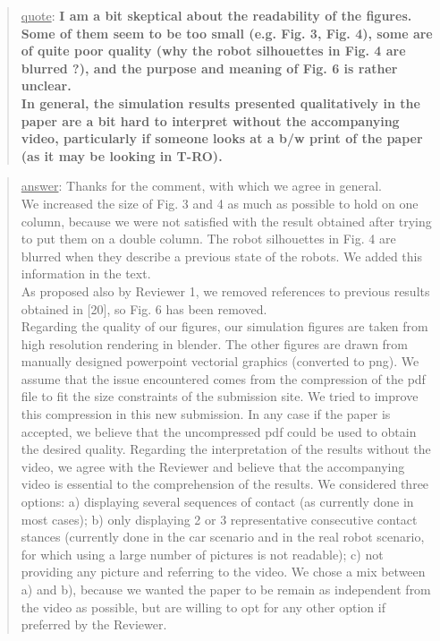 \documentclass[a4paper]{article}
\newcommand{\done}[0]{}
\newcommand{\ndone}[0]{\textcolor{red}{TODO}}
\newcommand\quot[1]{\begin{quote} \underline{quote}: \textbf{#1}\end{quote}}
\newcommand\as[1]{\begin{quote} \underline{answer}: {#1}\end{quote} }
\begin{document}
\quot{I am a bit skeptical about the readability of the figures. Some of them seem to be too small (e.g. Fig. 3, Fig. 4), some are of quite poor quality (why the robot silhouettes in Fig. 4 are blurred ?), and the purpose and meaning of Fig. 6 is rather unclear. \\ In general, the simulation results presented qualitatively in the paper are a bit hard to interpret without the accompanying video, particularly if someone looks at a b/w print of the paper (as it may be looking in T-RO).}
\as{Thanks for the comment, with which we agree in general.  \\We increased the size of Fig. 3 and 4 as much as possible to hold on one column, because we were not satisfied with the result obtained after trying to put them on a double column. The robot silhouettes in Fig. 4 are blurred when they describe a previous state of the robots. We added this information in the text. \\ As proposed also by Reviewer 1, we removed references to previous results obtained in [20], so Fig. 6 has been removed.
\\Regarding the quality of our figures,  our simulation figures are taken from high resolution rendering in blender. The other figures are drawn from manually designed powerpoint vectorial graphics (converted to png). We assume that the issue encountered comes from the compression of the pdf file to fit the size constraints of the 
submission site. We tried to improve this compression in this new submission. In any case if the paper is accepted, we believe that the uncompressed pdf could be used to obtain the desired quality.
Regarding the interpretation of the results without the video, we agree with the Reviewer and believe that the accompanying video is essential to the comprehension of the results. We considered three options: a) displaying several sequences of contact (as currently done in most cases); b) only displaying 2 or 3 representative consecutive contact stances (currently done
in the car scenario and in the real robot scenario, for which using a large number of pictures is not readable); c)
not providing any picture and referring to the video. We chose a mix between a) and b), because we wanted the paper to be remain as independent from the video as possible, but are willing to opt for any other option if preferred by the Reviewer.}\done

\end{document}
